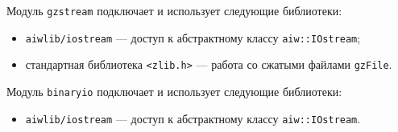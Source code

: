 Модуль \verb'gzstream' подключает и использует следующие библиотеки:
\begin{itemize}
\item \verb'aiwlib/iostream' --- доступ к абстрактному классу \verb'aiw::IOstream';
\item стандартная библиотека \verb'<zlib.h>' --- работа со сжатыми файлами \verb'gzFile'.
\end{itemize}

Модуль \verb'binaryio' подключает и использует следующие библиотеки:
\begin{itemize}
\item \verb'aiwlib/iostream' --- доступ к абстрактному классу \verb'aiw::IOstream'.
\end{itemize}
